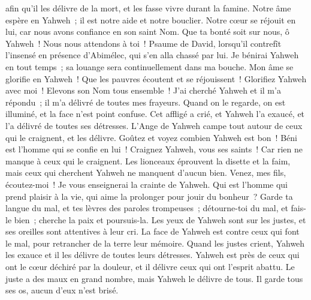\begin{multicols}{2}
afin qu'il les délivre de la mort, et les fasse vivre durant la famine.
Notre âme espère en Yahweh~; il est notre aide et notre bouclier.
Notre cœur se réjouit en lui, car nous avons confiance en son saint Nom.
Que ta bonté soit sur nous, ô Yahweh~! Nous nous attendons à toi~!
\VerseOne{}Psaume de David, lorsqu'il contrefît l'insensé en présence d'Abimélec, qui s'en alla chassé par lui.
 Je bénirai Yahweh en tout temps~; sa louange sera continuellement dans ma bouche.
 Mon âme se glorifie en Yahweh~! Que les pauvres écoutent et se réjouissent~!
 Glorifiez Yahweh avec moi~! Elevons son Nom tous ensemble~!
 J'ai cherché Yahweh et il m'a répondu~; il m'a délivré de toutes mes frayeurs.
 Quand on le regarde, on est illuminé, et la face n'est point confuse.
 Cet affligé a crié, et Yahweh l'a exaucé, et l'a délivré de toutes ses détresses.
 L'Ange de Yahweh campe tout autour de ceux qui le craignent, et les délivre.
 Goûtez et voyez combien Yahweh est bon~! Béni est l'homme qui se confie en lui~!
 Craignez Yahweh, vous ses saints~! Car rien ne manque à ceux qui le craignent.
 Les lionceaux éprouvent la disette et la faim, mais ceux qui cherchent Yahweh ne manquent d'aucun bien.
 Venez, mes fils, écoutez-moi~! Je vous enseignerai la crainte de Yahweh.
 Qui est l'homme qui prend plaisir à la vie, qui aime la prolonger pour jouir du bonheur~?
 Garde ta langue du mal, et tes lèvres des paroles trompeuses~;
 détourne-toi du mal, et fais-le bien~; cherche la paix et poursuis-la.
 Les yeux de Yahweh sont sur les justes, et ses oreilles sont attentives à leur cri.
 La face de Yahweh est contre ceux qui font le mal, pour retrancher de la terre leur mémoire.
 Quand les justes crient, Yahweh les exauce et il les délivre de toutes leurs détresses.
 Yahweh est près de ceux qui ont le cœur déchiré par la douleur, et il délivre ceux qui ont l'esprit abattu.
 Le juste a des maux en grand nombre, mais Yahweh le délivre de tous.
 Il garde tous ses os, aucun d'eux n'est brisé.

\end{multicols}
